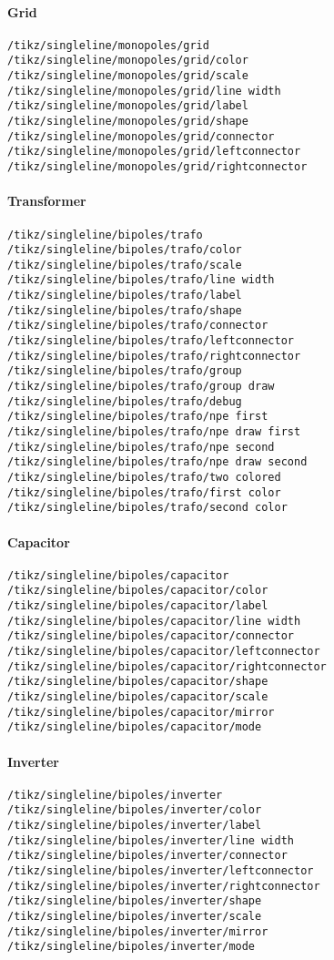 \documentclass[a4]{article}
\begin{document}
\begin{footnotesize}
\paragraph{Grid}
\begin{verbatim}
/tikz/singleline/monopoles/grid
/tikz/singleline/monopoles/grid/color
/tikz/singleline/monopoles/grid/scale
/tikz/singleline/monopoles/grid/line width
/tikz/singleline/monopoles/grid/label
/tikz/singleline/monopoles/grid/shape
/tikz/singleline/monopoles/grid/connector
/tikz/singleline/monopoles/grid/leftconnector
/tikz/singleline/monopoles/grid/rightconnector
\end{verbatim}
\paragraph{Transformer}
\begin{verbatim}
/tikz/singleline/bipoles/trafo
/tikz/singleline/bipoles/trafo/color
/tikz/singleline/bipoles/trafo/scale
/tikz/singleline/bipoles/trafo/line width
/tikz/singleline/bipoles/trafo/label
/tikz/singleline/bipoles/trafo/shape
/tikz/singleline/bipoles/trafo/connector
/tikz/singleline/bipoles/trafo/leftconnector
/tikz/singleline/bipoles/trafo/rightconnector
/tikz/singleline/bipoles/trafo/group
/tikz/singleline/bipoles/trafo/group draw
/tikz/singleline/bipoles/trafo/debug
/tikz/singleline/bipoles/trafo/npe first
/tikz/singleline/bipoles/trafo/npe draw first
/tikz/singleline/bipoles/trafo/npe second
/tikz/singleline/bipoles/trafo/npe draw second
/tikz/singleline/bipoles/trafo/two colored
/tikz/singleline/bipoles/trafo/first color
/tikz/singleline/bipoles/trafo/second color
\end{verbatim}
\paragraph{Capacitor}
\begin{verbatim}
/tikz/singleline/bipoles/capacitor
/tikz/singleline/bipoles/capacitor/color
/tikz/singleline/bipoles/capacitor/label
/tikz/singleline/bipoles/capacitor/line width
/tikz/singleline/bipoles/capacitor/connector
/tikz/singleline/bipoles/capacitor/leftconnector
/tikz/singleline/bipoles/capacitor/rightconnector
/tikz/singleline/bipoles/capacitor/shape
/tikz/singleline/bipoles/capacitor/scale
/tikz/singleline/bipoles/capacitor/mirror
/tikz/singleline/bipoles/capacitor/mode
\end{verbatim}
\paragraph{Inverter}
\begin{verbatim}
/tikz/singleline/bipoles/inverter
/tikz/singleline/bipoles/inverter/color
/tikz/singleline/bipoles/inverter/label
/tikz/singleline/bipoles/inverter/line width
/tikz/singleline/bipoles/inverter/connector
/tikz/singleline/bipoles/inverter/leftconnector
/tikz/singleline/bipoles/inverter/rightconnector
/tikz/singleline/bipoles/inverter/shape
/tikz/singleline/bipoles/inverter/scale
/tikz/singleline/bipoles/inverter/mirror
/tikz/singleline/bipoles/inverter/mode
\end{verbatim}

\end{footnotesize}
\end{document}
